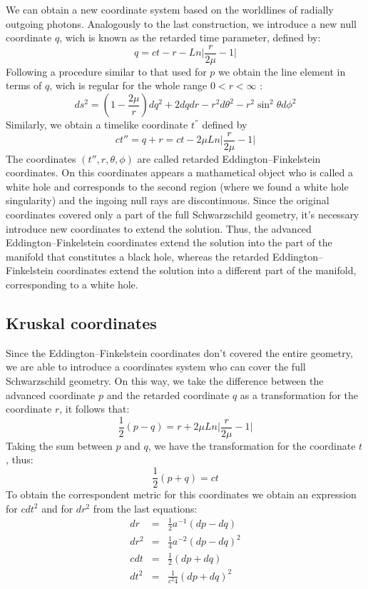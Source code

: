 \documentclass[letterpaper,11pt,onecolumn]{article}
\begin{document}
We can obtain a new coordinate system based on the worldlines of radially outgoing photons. Analogously to the last construction, we introduce a new null coordinate $q$, wich is known as the retarded time parameter, defined by:
\begin{equation}
    q= ct - r - Ln\Big| \frac{r}{2\mu}-1 \Big|\label{46}
\end{equation}
Following a procedure similar to that used for $p$ we obtain the line element in terms of $q$, wich is regular for the whole range $0<r<\infty$ :
\begin{equation}
ds^2 =\left( 1 - \frac{2\mu}{r}\right)dq^2+2dqdr- r^2 d\theta^2 - r^2 \sin^2 \theta d\phi^2 \label{5}
\end{equation}
Similarly, we obtain a timelike coordinate $t^{''}$ defined by
\begin{equation}
    ct''= q+r=ct-2\mu Ln\Big| \frac{r}{2\mu}-1 \Big|\label{6}
\end{equation}
The coordinates $(t'',r,\theta,\phi)$ are called retarded Eddington–Finkelstein coordinates. On this coordinates appears a mathametical object who is called a white hole and corresponds to the second region (where we found a white hole singularity) and the ingoing null rays are discontinuous. Since the original coordinates covered only a part of the full Schwarzschild geometry, it's necessary introduce new coordinates to extend the solution. Thus, the advanced Eddington–Finkelstein coordinates extend the solution into the part of the manifold that constitutes a black hole, whereas the retarded Eddington–Finkelstein coordinates extend the solution into a different part of the manifold, corresponding to a white hole. 

\subsection{Kruskal coordinates}
Since the Eddington–Finkelstein coordinates don't covered the entire geometry, we are able to introduce a coordinates system who can cover the full Schwarzschild geometry. On this way, we take the difference between the advanced coordinate $p$ and the retarded coordinate $q$ as a transformation for the coordinate $r$, it follows that:
\begin{equation*}
    \frac{1}{2}(p-q)=r+2\mu Ln\Big| \frac{r}{2\mu}-1 \Big|
\end{equation*}
Taking the sum between $p$ and $q$, we have the transformation for the coordinate $t$, thus:
\begin{equation}
    \frac{1}{2}(p+q)=ct \label{50}
\end{equation}
To obtain the correspondent metric for this coordinates we obtain an expression for $cdt^2$ and for $dr^2$ from the last equations:
\begin{eqnarray*}
dr&=& \frac{1}{2}a^{-1}(dp-dq)\\
dr^2&=& \frac{1}{4}a^{-2}(dp-dq)^2\\
    cdt&=& \frac{1}{2}(dp+dq) \\
    dt^{2}&=& \frac{1}{c^{2}4}(dp+dq)^2
\end{eqnarray*}
\end{document}
